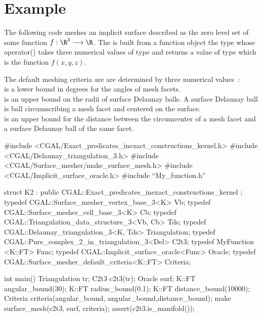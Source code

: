 \section{Example}
\label{SurfaceMesher_section_example}

The following code meshes an implicit surface described as the zero level
set of some function $f : \R^3 \longrightarrow \R$.
The   is built from 
a function object
the type  whose operator()
takes three numerical values  of type 
and returns a value of type  which is the function $f(x,y,z)$.

The default meshing criteria are  are determined  by three numerical
values~: \\ 
 is a lower bound in degrees for the angles 
     of mesh facets.\\
 is an upper bound on the radii of surface Delaunay
balls. A surface Delaunay ball is ball circumscribing a mesh facet
and centered on the surface. \\
 is an upper bound for the distance 
between the circumcenter of a mesh facet and a surface
Delaunay ball of the same facet.

\begin{ccExampleCode}

#include <CGAL/Exact_predicates_inexact_constructions_kernel.h>
#include <CGAL/Delaunay_triangulation_3.h>
#include <CGAL/Surface_mesher/make_surface_mesh.h>
#include <CGAL/Implicit_surface_oracle.h>
#include ``My_function.h''

struct K2 : public CGAL::Exact_predicates_inexact_constructions_kernel {};
typedef CGAL::Surface_mesher_vertex_base_3<K> Vb;
typedef CGAL::Surface_mesher_cell_base_3<K> Cb;
typedef CGAL::Triangulation_data_structure_3<Vb, Cb> Tds;
typedef CGAL::Delaunay_triangulation_3<K, Tds> Triangulation;
typedef CGAL::Pure_complex_2_in_triangulation_3<Del> C2t3;
typedef MyFunction <K::FT> Func;
typedef CGAL::Implicit_surface_oracle<Func>  Oracle;
typedef  CGAL::Surface_mesher_default_criteria<K::FT> Criteria;

int main() {
     Triangulation tr;
     C2t3      c2t3(tr);
     Oracle    surf;
     K::FT     angular_bound(30);
     K::FT     radius_bound(0.1);
     K::FT     distance_bound(10000);
     Criteria  criteria(angular_bound, angular_bound,distance_bound);
     make surface_mesh(c2t3, surf, criteria);
     assert(c2t3.is_manifold());
}

\end{ccExampleCode}


